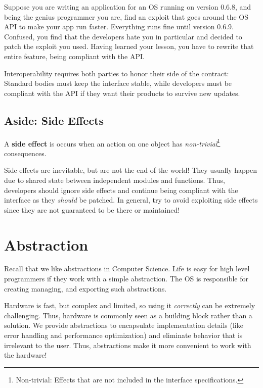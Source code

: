 \documentclass{report}
\begin{document}
\begin{tcolorbox}[colback=blue!5!white,colframe=black!75!blue,title=Example: New Version New Problems] 
  Suppose you are writing an application for an OS running on version 0.6.8, and being the genius
  programmer you are, find an exploit that goes around the OS API to make your app run
  faster. Everything runs fine until version 0.6.9. Confused, you find that the developers hate you
  in particular and decided to patch the exploit you used. Having learned your lesson, you have to
  rewrite that entire feature, being compliant with the API.
\end{tcolorbox}

Interoperability requires both parties to honor their side of the contract: Standard bodies must
keep the interface stable, while developers must be compliant with the API if they want their
products to survive new updates.


\section{Aside: Side Effects}

\begin{tcolorbox}[title=Definition: Side Effect]
  A \textbf{side effect} is occurs when an action on one object has
  \textit{non-trivial}\footnote{Non-trivial: Effects that are not included in the interface
    specifications.} consequences. 
\end{tcolorbox}

Side effects are inevitable, but are not the end of the world! They usually happen due to shared
state between independent modules and functions. Thus, developers should ignore side effects and
continue being compliant with the interface as they \textit{should} be patched. In general, try to
avoid exploiting side effects since they are not guaranteed to be there or maintained! 





\chapter{Abstraction}
Recall that we like abstractions in Computer Science. Life is easy for high level programmers if
they work with a simple abstraction. The OS is responsible for creating managing, and exporting such
abstractions.

\begin{tcolorbox}[colback=blue!5!white,colframe=black!75!blue,title=Example: Hardware Hiding] 
  Hardware is fast, but complex and limited, so using it \textit{correctly} can be extremely
  challenging. Thus, hardware is commonly seen as a building block rather than a solution. We
  provide abstractions to encapsulate implementation details (like error handling and performance
  optimization) and eliminate behavior that is irrelevant to the user. Thus, abstractions make
  it more convenient to work with the hardware!
\end{tcolorbox}
\end{document}
